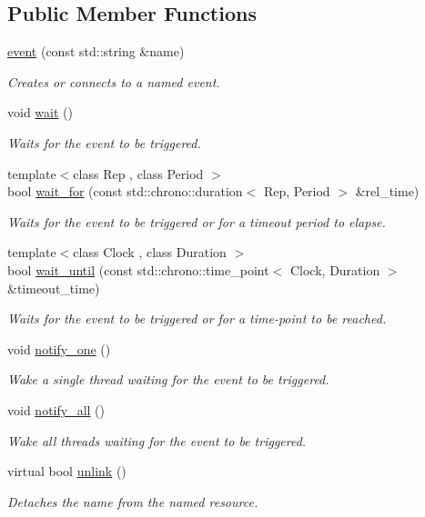 \subsection*{Public Member Functions}
\begin{DoxyCompactItemize}
\item 
\hyperlink{classcpen333_1_1process_1_1event_a83253320779b5b9fd26b823608e69977}{event} (const std\+::string \&name)
\begin{DoxyCompactList}\small\item\em Creates or connects to a named event. \end{DoxyCompactList}\item 
void \hyperlink{classcpen333_1_1process_1_1event_ae02584676aa834eef81b74d01ceb3ea5}{wait} ()
\begin{DoxyCompactList}\small\item\em Waits for the event to be triggered. \end{DoxyCompactList}\item 
{\footnotesize template$<$class Rep , class Period $>$ }\\bool \hyperlink{classcpen333_1_1process_1_1event_a9b887906af309ccc8687cb91f3c66b25}{wait\+\_\+for} (const std\+::chrono\+::duration$<$ Rep, Period $>$ \&rel\+\_\+time)
\begin{DoxyCompactList}\small\item\em Waits for the event to be triggered or for a timeout period to elapse. \end{DoxyCompactList}\item 
{\footnotesize template$<$class Clock , class Duration $>$ }\\bool \hyperlink{classcpen333_1_1process_1_1event_ac64e2c2152ce879b199271f96e0a7335}{wait\+\_\+until} (const std\+::chrono\+::time\+\_\+point$<$ Clock, Duration $>$ \&timeout\+\_\+time)
\begin{DoxyCompactList}\small\item\em Waits for the event to be triggered or for a time-\/point to be reached. \end{DoxyCompactList}\item 
void \hyperlink{classcpen333_1_1process_1_1event_a47077325cc6cb29df3aba00de683ce42}{notify\+\_\+one} ()
\begin{DoxyCompactList}\small\item\em Wake a single thread waiting for the event to be triggered. \end{DoxyCompactList}\item 
void \hyperlink{classcpen333_1_1process_1_1event_a80184c9e2762fb1a0d7f3a9ff6ae27e7}{notify\+\_\+all} ()
\begin{DoxyCompactList}\small\item\em Wake all threads waiting for the event to be triggered. \end{DoxyCompactList}\item 
virtual bool \hyperlink{classcpen333_1_1process_1_1event_a37a2d53cbf4a90da6b4dbd5853f23b32}{unlink} ()
\begin{DoxyCompactList}\small\item\em Detaches the name from the named resource. \end{DoxyCompactList}\end{DoxyCompactItemize}
